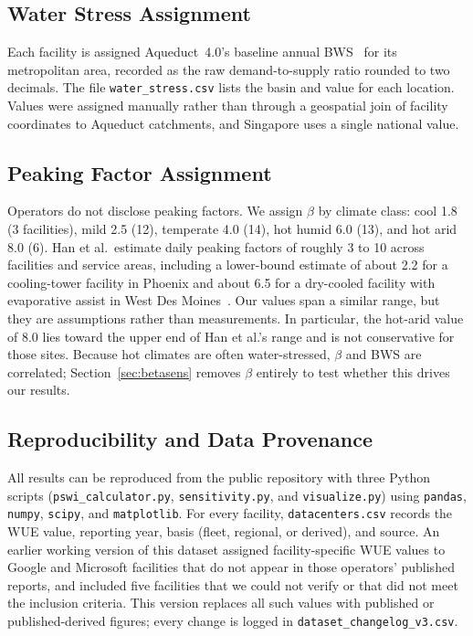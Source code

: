 \documentclass[conference,10pt]{IEEEtran}
\begin{document}
\subsection{Water Stress Assignment}

Each facility is assigned Aqueduct~4.0's baseline annual
BWS~\cite{kuzma2023aqueduct} for its metropolitan area, recorded as the raw
demand-to-supply ratio rounded to two decimals. The file
\texttt{water\_stress.csv} lists the basin and value for each location.
Values were assigned manually rather than through a geospatial join of
facility coordinates to Aqueduct catchments, and Singapore uses a single
national value.

\subsection{Peaking Factor Assignment}

Operators do not disclose peaking factors. We assign $\beta$ by climate
class: cool 1.8 (3 facilities), mild 2.5 (12), temperate 4.0 (14), hot humid
6.0 (13), and hot arid 8.0 (6). Han et al.\ estimate daily peaking factors
of roughly 3 to 10 across facilities and service areas, including a
lower-bound estimate of about 2.2 for a cooling-tower facility in Phoenix
and about 6.5 for a dry-cooled facility with evaporative assist in West Des
Moines~\cite{han2026}. Our values span a similar range, but they are
assumptions rather than measurements. In particular, the hot-arid value of
8.0 lies toward the upper end of Han et al.'s range and is not conservative
for those sites. Because hot climates are often water-stressed, $\beta$ and
BWS are correlated; Section~\ref{sec:betasens} removes $\beta$ entirely to
test whether this drives our results.

\subsection{Reproducibility and Data Provenance}

All results can be reproduced from the public repository with three Python
scripts (\texttt{pswi\_calculator.py}, \texttt{sensitivity.py}, and
\texttt{visualize.py}) using \texttt{pandas}, \texttt{numpy},
\texttt{scipy}, and \texttt{matplotlib}. For every facility,
\texttt{datacenters.csv} records the WUE value, reporting year, basis
(fleet, regional, or derived), and source. An earlier working version of
this dataset assigned facility-specific WUE values to Google and Microsoft
facilities that do not appear in those operators' published reports, and
included five facilities that we could not verify or that did not meet the
inclusion criteria. This version replaces all such values with published or
published-derived figures; every change is logged in
\texttt{dataset\_changelog\_v3.csv}.
\end{document}
